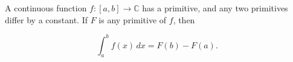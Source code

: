 A continuous function $f: [a, b] \to \mathbb{C}$ has a primitive, and any two primitives differ by a constant. If $F$ is any primitive of $f$, then

$$\int_{a}^{b} f(x) \, dx = F(b) - F(a).$$
